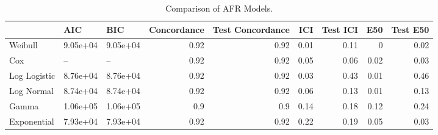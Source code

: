 \begin{table*}
\centering
\caption{Comparison of AFR Models.}
\label{tab:combined}
\begin{tabular}{lllrrrrrr}
\toprule
 & AIC & BIC & Concordance & Test Concordance & ICI & Test ICI & E50 & Test E50 \\
\midrule
Weibull & 9.05e+04 & 9.05e+04 & 0.92 & 0.92 & 0.01 & 0.11 & 0 & 0.02 \\
Cox & -- & -- & 0.92 & 0.92 & 0.05 & 0.06 & 0.02 & 0.03 \\
Log Logistic & 8.76e+04 & 8.76e+04 & 0.92 & 0.92 & 0.03 & 0.43 & 0.01 & 0.46 \\
Log Normal & 8.74e+04 & 8.74e+04 & 0.92 & 0.92 & 0.06 & 0.13 & 0.01 & 0.13 \\
Gamma & 1.06e+05 & 1.06e+05 & 0.9 & 0.9 & 0.14 & 0.18 & 0.12 & 0.24 \\
Exponential & 7.93e+04 & 7.93e+04 & 0.92 & 0.92 & 0.22 & 0.19 & 0.05 & 0.03 \\
\bottomrule
\end{tabular}
\end{table*}
